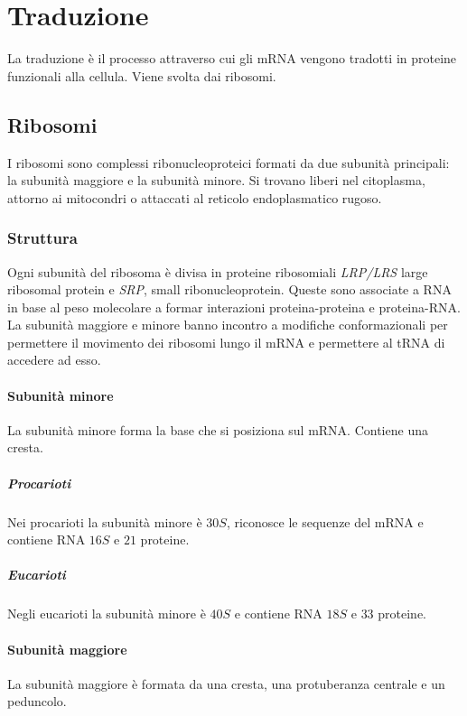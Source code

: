 \chapter{Traduzione}
La traduzione \`e il processo attraverso cui gli mRNA vengono tradotti in proteine funzionali alla cellula.
Viene svolta dai ribosomi.

\section{Ribosomi}
I ribosomi sono complessi ribonucleoproteici formati da due subunit\`a principali: la subunit\`a maggiore e la subunit\`a minore.
Si trovano liberi nel citoplasma, attorno ai mitocondri o attaccati al reticolo endoplasmatico rugoso.

	\subsection{Struttura}
	Ogni subunit\`a del ribosoma \`e divisa in proteine ribosomiali \emph{LRP/LRS} large ribosomal protein e \emph{SRP}, small ribonucleoprotein.
	Queste sono associate a RNA in base al peso molecolare a formar interazioni proteina-proteina e proteina-RNA.
	La subunit\`a maggiore e minore banno incontro a modifiche conformazionali per permettere il movimento dei ribosomi lungo il mRNA e permettere al tRNA di accedere ad esso.

		\subsubsection{Subunit\`a minore}
		La subunit\`a minore forma la base che si posiziona sul mRNA.
		Contiene una cresta.
		
			\paragraph{Procarioti}
			Nei procarioti la subunit\`a minore \`e $30S$, riconosce le sequenze del mRNA e contiene RNA $16S$ e $21$ proteine.

			\paragraph{Eucarioti}
			Negli eucarioti la subunit\`a minore \`e $40S$ e contiene RNA $18S$ e $33$ proteine.

		\subsubsection{Subunit\`a maggiore}
		La subunit\`a maggiore \`e formata da una cresta, una protuberanza centrale e un peduncolo.
			
